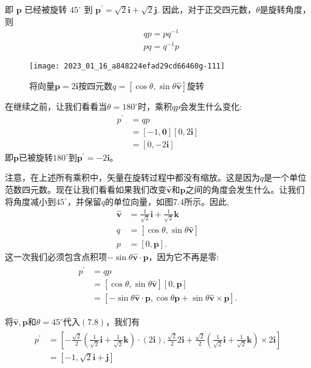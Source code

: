 即 $\mathbf{p}$ 已经被旋转 $45^{\circ}$ 到 $\mathbf{p}^{\prime}=\sqrt{2} \mathbf{i}+\sqrt{2} \mathbf{j}$. 因此，对于正交四元数，$\theta$是旋转角度，则
$$
\begin{aligned}
& q p=p q^{-1} \\
& p q=q^{-1} p
\end{aligned}
$$

\begin{figure}[h!]
    \centering
    \texttt{[image: 2023\_01\_16\_a848224efad29cd66460g-111]}
    \caption[short]{将向量$\mathbf{p}=2 \mathbf{i}$按四元数$q=[\cos \theta, \sin \theta \hat{\mathbf{v}}]$旋转}
\end{figure}

在继续之前，让我们看看当$\theta=180^{\circ}$时，乘积$q p$会发生什么变化:
$$
\begin{aligned}
p^{\prime} & =q p \\
& =[-1, \mathbf{0}][0,2 \mathbf{i}] \\
& =[0,-2 \mathbf{i}]
\end{aligned}
$$
即$\mathbf{p}$已被旋转$180^{\circ}$到$\mathbf{p}^{\prime}=-2 \mathbf{i}$。

注意，在上述所有乘积中，矢量在旋转过程中都没有缩放。这是因为$q$是一个单位范数四元数。现在让我们看看如果我们改变$\hat{\mathbf{v}}$和$\mathbf{p}$之间的角度会发生什么。让我们将角度减小到$45^{\circ}$，并保留$q$的单位向量，如图7.4所示。因此,
$$
\begin{aligned}
\hat{\mathbf{v}} & =\frac{1}{\sqrt{2}} \mathbf{i}+\frac{1}{\sqrt{2}} \mathbf{k} \\
q & =[\cos \theta, \sin \theta \hat{\mathbf{v}}] \\
p & =[0, \mathbf{p}] .
\end{aligned}
$$
这一次我们必须包含点积项$-\sin \theta \hat{\mathbf{v}} \cdot \mathbf{p}$，因为它不再是零:
\begin{align}
    \begin{aligned}
        p^{\prime} & =q p \\
        & =[\cos \theta, \sin \theta \hat{\mathbf{v}}][0, \mathbf{p}] \\
        & =[-\sin \theta \hat{\mathbf{v}} \cdot \mathbf{p}, \cos \theta \mathbf{p}+\sin \theta \hat{\mathbf{v}} \times \mathbf{p}] .
    \end{aligned}
\end{align}


将$\hat{\mathbf{v}}, \mathbf{p}$和$\theta=45^{\circ}$代入$(7.8)$，我们有
\begin{align}
    \begin{aligned}
        p^{\prime} & =\left[-\frac{\sqrt{2}}{2}\left(\frac{1}{\sqrt{2}} \mathbf{i}+\frac{1}{\sqrt{2}} \mathbf{k}\right) \cdot(2 \mathbf{i}), \frac{\sqrt{2}}{2} 2 \mathbf{i}+\frac{\sqrt{2}}{2}\left(\frac{1}{\sqrt{2}} \mathbf{i}+\frac{1}{\sqrt{2}} \mathbf{k}\right) \times 2 \mathbf{i}\right] \\
        & =[-1, \sqrt{2} \mathbf{i}+\mathbf{j}]
        \end{aligned}
\end{align}


